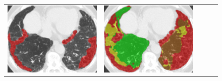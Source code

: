 \begin{figure}[htbp]
\begin{tabular}{ccccc}
\begin{minipage}[c]{.21\textwidth}
      \includegraphics[width=1\textwidth]{images/median/truth/3_0835_20080825_3_95.png}
    \end{minipage} &
    \begin{minipage}[c]{.21\textwidth}
      \centering
      \includegraphics[width=1\textwidth]{images/median/alpha0/3_0835_20080825_3_95.png}
    \end{minipage} &
    \begin{minipage}[c]{.21\textwidth}
      \centering

\end{minipage}
\end{tabular}
\end{figure}

